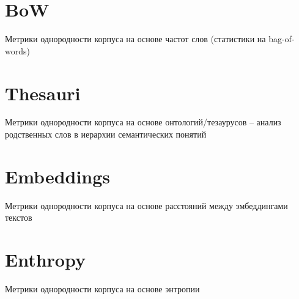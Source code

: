 \section{BoW}

Метрики однородности корпуса на основе частот слов (статистики на bag-of-words)

\section{Thesauri}

Метрики однородности корпуса на основе онтологий/тезаурусов – анализ родственных слов в иерархии
семантических понятий

\section{Embeddings}

Метрики однородности корпуса на основе расстояний между эмбеддингами текстов

\section{Enthropy}

Метрики однородности корпуса на основе энтропии
